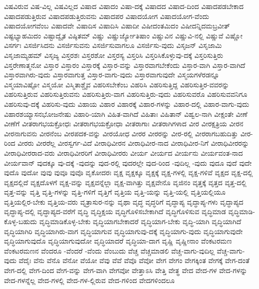 {ವಿಷವಿರುವ
ವಿಷ-ವಿಲ್ಲ
ವಿಷವಿಲ್ಲದ
ವಿಷಾದ
ವಿಷಾದಂ
ವಿಷಾ-ದಕ್ಕೆ
ವಿಷಾದದ
ವಿಷಾದ-ದಿಂದ
ವಿಷಾದಪಡಬೇಕಾದ
ವಿಷಾದಪಡುತ್ತಿರುವ
ವಿಷಾದಪಡುತ್ತಿರುವನು
ವಿಷಾದಪರ
ವಿಷಾದಯೋಗ
ವಿಷಾದಯೋಗ-ವೆಂದು
ವಿಷಾದಯೋಗವೆಂಬ
ವಿಷಾದವೇ
ವಿಷಾದಿಸ
ವಿಷಾದಿಸಿ
ವಿಷಾದೀ
ವಿಷೀದಂತಮಿದಂ
ವಿಷೀದನ್ನಿದಮಬ್ರವೀತ್
ವಿಷ್ಟಭ್ಯಾಹಮಿದಂ
ವಿಷ್ಟಾದ್ವೈತ
ವಿಷ್ಠಿತಮ್
ವಿಷ್ಣು
ವಿಷ್ಣುರ್ಜ್ಯೋತಿಷಾಂ
ವಿಷ್ಣುವಿನ
ವಿಷ್ಣುವಿ-ನಲ್ಲಿ
ವಿಷ್ಣುವೆ
ವಿಷ್ಣೋ
ವಿಸರ್ಗಃ
ವಿಸರ್ಜಿಸಿದನು
ವಿಸರ್ಜಿಸುವನು
ವಿಸರ್ಜಿಸುವಾಗಲೂ
ವಿಸರ್ಜಿಸು-ವುದು
ವಿಸೃಜನ್
ವಿಸೃಜಾಮಿ
ವಿಸೃಜಾಮ್ಯಹಮ್
ವಿಸೃಜ್ಯ
ವಿಸ್ತರಶಃ
ವಿಸ್ತರಶೋ
ವಿಸ್ತರಸ್ಯ
ವಿಸ್ತರಿಸಿ
ವಿಸ್ತರಿಸಿಕೊಳ್ಳುವು-ದಕ್ಕೆ
ವಿಸ್ತರಿಸುತ್ತಿರು
ವಿಸ್ತರೇಣಾತ್ಮನೋ
ವಿಸ್ತಾರ
ವಿಸ್ತಾರಂ
ವಿಸ್ತಾರಕ್ಕೆ
ವಿಸ್ತಾರ-ವನ್ನು
ವಿಸ್ತಾರವಾಗಬೇಕೆಂದು
ವಿಸ್ತಾರ-ವಾಗಿ
ವಿಸ್ತಾರ-ವಾಗಿದೆ
ವಿಸ್ತಾರವಾಗಿರು-ವುದು
ವಿಸ್ತಾರವಾಗುತ್ತ
ವಿಸ್ತಾರ-ವಾಗು-ವುದು
ವಿಸ್ತಾರವಾಗುವುದೇ
ವಿಸ್ಮಯಗಳೆರಡನ್ನೂ
ವಿಸ್ಮಯಾವಿಷ್ಟೋ
ವಿಸ್ಮಯೋ
ವಿಸ್ಮಿತಾಶ್ಚೈವ
ವಿಹರಿಸಬೇಕೆಂಬ
ವಿಹರಿಸಿ
ವಿಹರಿಸುತ್ತಿದ್ದ
ವಿಹರಿಸುತ್ತಿರ-ವವರನ್ನು
ವಿಹರಿಸುತ್ತಿರುವ
ವಿಹರಿಸುತ್ತಿರುವನು
ವಿಹರಿಸುತ್ತಿರು-ವಾಗ
ವಿಹರಿಸುತ್ತಿರು-ವುದು
ವಿಹರಿಸುವರೊ
ವಿಹರಿಸುವವನಿಗೂ
ವಿಹರಿಸುವು-ದಕ್ಕೆ
ವಿಹರಿಸು-ವುದು
ವಿಹಾಯ
ವಿಹಾರ
ವಿಹಾರಕ್ಕೆ
ವಿಹಾರ-ಗಳನ್ನು
ವಿಹಾರ-ದಲ್ಲಿ
ವಿಹಾರ-ವಾಗು-ವುದು
ವಿಹಾರಶಯ್ಯಾಸನಭೋಜನೇಷು
ವಿಹಾರಿ-ಯಾಗಿ
ವಿಹಿತ-ವಾಗಿದೆ
ವಿಹಿತಾಃ
ವಿಹಿತಾನ್
ವಿಹ್ವಲ-ನಾಗಿ
ವೀಕ್ಷಂತೇ
ವೀಣೆ
ವೀಣೆಗೆ
ವೀತರಾಗಭಯಕ್ರೋಧಃ
ವೀತರಾಗಭಯಕ್ರೋಧಾ
ವೀತರಾಗಾಃ
ವೀತರಾಗಿಗಳಾದ
ವೀರ
ವೀರಕ್ಷತ್ರಿಯ
ವೀರನ
ವೀರನಾಗುವನು
ವೀರನೆಂಬ
ವೀರಪದಕ-ವನ್ನು
ವೀರಯೋಧ
ವೀರರ
ವೀರರನ್ನು
ವೀರ-ರಲ್ಲಿ
ವೀರರಾಗಬಹುದಿತ್ತು
ವೀರ-ರಿಂದ
ವೀರರು
ವೀರರೆಲ್ಲ
ವೀರಸ್ವರ್ಗ-ವಿದೆ
ವೀರಾಧಿವೀರನ
ವೀರಾಧಿವೀರ-ನಾದ
ವೀರಾಧಿವೀರ-ನಿಗೆ
ವೀರಾಧಿವೀರರನ್ನು
ವೀರಾಧಿವೀರರಾದ-ವರು
ವೀರಾಧಿವೀರರಿಗೆ
ವೀರಾಧಿವೀರರು
ವೀರ್ಯ
ವೀರ್ಯದ
ವೀರ್ಯನು
ವೀರ್ಯವಂತ-ನಾದ
ವೀರ್ಯವಾನ್
ವುದಕ್ಕೂ
ವು-ದಕ್ಕೆ
-ವುದನ್ನು
ವುದ-ರಲ್ಲಿ
ವುದರಲ್ಲೇ
ವುದ-ರಿಂದ
-ವುದಿಲ್ಲ
-ವುದು
ವುದೂ
ವುದೆ
ವುದೇ
ವುದೊ
ವುದೋ
ವುವು
ವುವೂ
ವುವೊ
ವೃಕೋದರಃ
ವೃಕ್ಷ
ವೃಕ್ಷಕ್ಕೂ
ವೃಕ್ಷಕ್ಕೆ
ವೃಕ್ಷ-ಗಳಲ್ಲಿ
ವೃಕ್ಷ-ಗಳಿವೆ
ವೃಕ್ಷದ
ವೃಕ್ಷ-ದಲ್ಲಿ
ವೃಕ್ಷದಲ್ಲಿದೆ
ವೃಕ್ಷದೊಳಗೆ
ವೃಕ್ಷ-ವನ್ನು
ವೃಕ್ಷವನ್ನೆಲ್ಲಾ
ವೃಕ್ಷ-ವಾಗಿತ್ತು
ವೃಕ್ಷವೇನೊ
ವೃಜಿನಂ
ವೃತ್ತಕ್ಕೆ
ವೃತ್ತದ
ವೃತ್ತ-ದಲ್ಲಿ
ವೃತ್ತ-ವನ್ನು
ವೃತ್ತಿ
ವೃತ್ತಿ-ಗಳನ್ನು
ವೃತ್ತಿ-ಗಳಿಗೆ
ವೃತ್ತಿಗೆ
ವೃತ್ತಿಯ
ವೃತ್ತಿ-ಯನ್ನು
ವೃತ್ತಿ-ಯಲ್ಲಿ
ವೃತ್ತಿಯಲ್ಲಿಯೂ
ವೃತ್ತಿಯಲ್ಲಿರ-ಬೇಕು
ವೃತ್ತಿಯ-ವರು
ವೃತ್ರಾಸುರ-ನನ್ನು
ವೃಥಾ
ವೃದ್ಧ
ವೃದ್ಧರಿಗೆ
ವೃದ್ಧಾಪ್ಯ
ವೃದ್ಧಾಪ್ಯ-ಗಳು
ವೃದ್ಧಾಪ್ಯದ
ವೃದ್ಧಾಪ್ಯ-ದಲ್ಲಿ
ವೃದ್ಧಾಪ್ಯದ-ವರೆಗೆ
ವೃದ್ಧಿ
ವೃದ್ಧಿಕ್ಷಯ
ವೃದ್ಧಿಗೊಳಿಸಬೇಕಾಗಿದೆ
ವೃದ್ಧಿಗೊಳಿಸುವ
ವೃದ್ಧಿಮಾಡ
ವೃದ್ಧಿಮಾಡಿ-ಕೊಳ್ಳ-ಬಹುದು
ವೃದ್ಧಿಮಾಡಿಕೊಳ್ಳ-ಬೇಕು
ವೃದ್ಧಿಯಾಗಬೇಕಾದರೆ
ವೃದ್ಧಿಯಾಗ-ಬೇಕು
ವೃದ್ಧಿ-ಯಾಗಿ
ವೃದ್ಧಿಯಾಗಿದೆ
ವೃದ್ಧಿಯಾಗಿರಿ
ವೃದ್ಧಿಯಾಗಿರು-ವಾಗ
ವೃದ್ಧಿಯಾಗುವ
ವೃದ್ಧಿಯಾಗುವು-ದಕ್ಕೆ
ವೃದ್ಧಿಯಾಗು-ವುದು
ವೃದ್ಧಿಯಾಗುವುದೇ
ವೃದ್ಧಿಯಾಗುವುದೊ
ವೃದ್ಧಿಯಾಗುವುದೋ
ವೃದ್ಧಿಯಾದರೆ
ವೃದ್ಧಿಯಾ-ದಾಗ
ವೃಷ್ಣಿ
ವೃಷ್ಣೀನಾಂ
ವೆಂಕಟರಮಣ
ವೆಂಕಟರಮಣನ
ವೆಂದರೂ
-ವೆಂದರೆ
-ವೆಂದು
ವೆಂಬುದು
ವೆಚ್ಚ
ವೆಚ್ಚಮಾಡಲಿ
ವೆಚ್ಚ-ವಾಗು-ವುದಿಲ್ಲ
ವೆಚ್ಚ-ವಾಗು-ವುದು
ವೆದೈಃ
ವೆನು
ವೆನೊ
ವೆನೋ
ವೆಯೋ
ವೆವು
ವೆವೆ
ವೆವೊ
ವೆವೋ
ವೇಗ
ವೇಗಂ
ವೇಗಕ್ಕಿಂತ
ವೇಗಕ್ಕೆ
ವೇಗ-ದಂತೆ
ವೇಗ-ದಲ್ಲಿ
ವೇಗ-ದಿಂದ
ವೇಗ-ವನ್ನು
ವೇಗ-ವಾಗಿ
ವೇಗವೋ
ವೇತ್ತಾಽಸಿ
ವೇತ್ತಿ
ವೇತ್ಥ
ವೇದ
ವೇದ-ಗಳ
ವೇದ-ಗಳನ್ನು
ವೇದ-ಗಳನ್ನೆಲ್ಲ
ವೇದ-ಗಳಲ್ಲಿ
ವೇದ-ಗಳ-ಲ್ಲಿರುವ
ವೇದ-ಗಳಿಂದ
ವೇದಗಳಿಂದಲೂ
}
